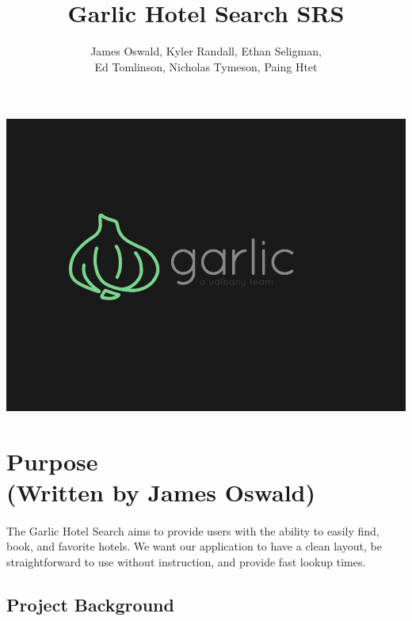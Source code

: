 \documentclass[]{article}
\title{Garlic Hotel Search SRS}
\author{James Oswald, Kyler Randall, Ethan Seligman,\\ Ed Tomlinson, Nicholas Tymeson, Paing Htet}
\date{}
\begin{document}
\maketitle
\vspace{2cm}
\includegraphics[scale=0.33]{Garlic.png}
\thispagestyle{fancy}

\newpage
\tableofcontents
\newpage

\section{Purpose \\(Written by James Oswald)}
\paragraph{}
The Garlic Hotel Search aims to provide users with the ability to easily find, book, and favorite hotels. We want our application to have a clean layout, be straightforward to use without instruction, and provide fast lookup times.
\subsection{Project Background}
\end{document}
